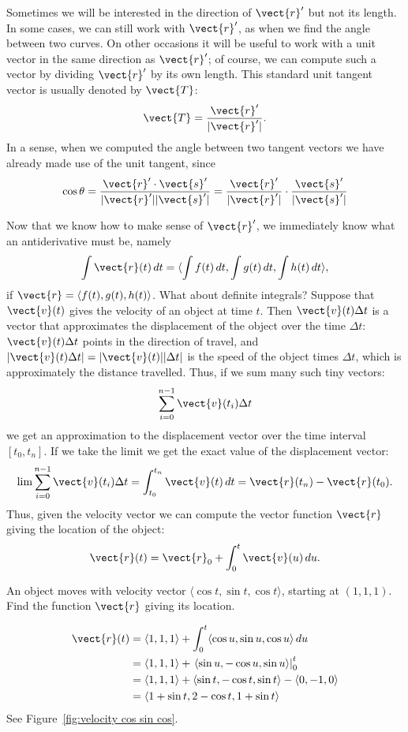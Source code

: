 Sometimes we will be interested in the direction of $\vect{r}'$ but not
its length. In some cases, we can still work with $\vect{r}'$, as when
we find the angle between two curves. On other occasions it will be
useful to work with a unit vector in the same
direction as $\vect{r}'$; of course, we can compute such a vector by
dividing $\vect{r}'$ by its own length. This standard unit tangent
vector is usually denoted by $\vect{T}$:
$$\vect{T}={\vect{r}'\over|\vect{r}'|}.$$
In a sense, when we computed the angle between two tangent vectors we
have already made use of the unit tangent, since
$$\cos\theta = {\vect{r}'\cdot\vect{s}'\over|\vect{r}'||\vect{s}'|}=
{\vect{r}'\over|\vect{r}'|}\cdot{\vect{s}'\over|\vect{s}'|}$$

Now that we know how to make sense of $\vect{r}'$, we immediately know
what an antiderivative must be, namely
$$\int \vect{r}(t)\,dt = \langle \int f(t)\,dt,\int g(t)\,dt,\int h(t)\,dt
\rangle,$$ if $\vect{r}=\langle f(t),g(t),h(t)\rangle$. What about
definite integrals?  Suppose that $\vect{v}(t)$ gives the velocity of
an object at time $t$. Then $\vect{v}(t)\Delta t$ is a vector that
approximates the displacement of the object over the time $\Delta t$:
$\vect{v}(t)\Delta t$ points in the direction of travel, and $|\vect{v}(t)\Delta t|=|\vect{v}(t)||\Delta t|$ is the speed of the object
times $\Delta t$, which is approximately the distance travelled. Thus,
if we sum many such tiny vectors:
$$\sum_{i=0}^{n-1}\vect{v}(t_i)\Delta t$$
we get an approximation to the displacement vector over the time
interval $[t_0,t_n]$. If we take the limit we get the exact
value of the displacement vector:
$$\lim\sum_{i=0}^{n-1}\vect{v}(t_i)\Delta t = \int_{t_0}^{t_n}\vect{v}(t)\,dt = \vect{r}(t_n)-\vect{r}(t_0).$$
Thus, given the velocity vector we can compute the vector function
$\vect{r}$ giving the location of the object:
$$\vect{r}(t)=\vect{r}_0+\int_0^t \vect{v}(u)\,du.$$

\begin{example}{}{}
An object moves with velocity vector $\langle \cos t, \sin t,
\cos t\rangle$, starting at $(1,1,1)$. Find the function
$\vect{r}$ giving its location.
\end{example}
\begin{solution}
\begin{align*}
\vect{r}(t)&=\langle 1,1,1\rangle+\int_0^t \langle \cos u, \sin u,
\cos u\rangle\,du	\\
&=\langle 1,1,1\rangle+\left.\langle \sin u, -\cos u,\sin u\rangle
\right|_0^t	\\
&=\langle 1,1,1\rangle+\langle \sin t, -\cos t,\sin t\rangle-
\langle 0,-1,0\rangle	\\
&=\langle 1+\sin t, 2-\cos t,1+\sin t\rangle
\end{align*}
See Figure~\ref{fig:velocity cos sin cos}.
\end{solution}

